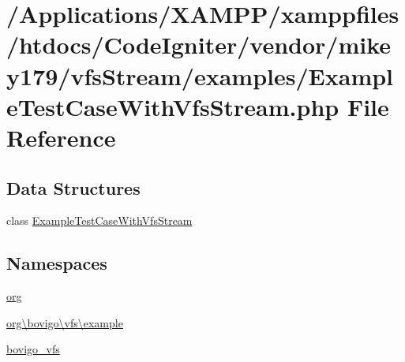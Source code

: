 \hypertarget{_example_test_case_with_vfs_stream_8php}{}\section{/\+Applications/\+X\+A\+M\+P\+P/xamppfiles/htdocs/\+Code\+Igniter/vendor/mikey179/vfs\+Stream/examples/\+Example\+Test\+Case\+With\+Vfs\+Stream.php File Reference}
\label{_example_test_case_with_vfs_stream_8php}
\subsection*{Data Structures}
\begin{DoxyCompactItemize}
\item 
class \mbox{\hyperlink{classorg_1_1bovigo_1_1vfs_1_1example_1_1_example_test_case_with_vfs_stream}{Example\+Test\+Case\+With\+Vfs\+Stream}}
\end{DoxyCompactItemize}
\subsection*{Namespaces}
\begin{DoxyCompactItemize}
\item 
 \mbox{\hyperlink{namespaceorg}{org}}
\item 
 \mbox{\hyperlink{namespaceorg_1_1bovigo_1_1vfs_1_1example}{org\textbackslash{}bovigo\textbackslash{}vfs\textbackslash{}example}}
\item 
 \mbox{\hyperlink{namespacebovigo__vfs}{bovigo\+\_\+vfs}}
\end{DoxyCompactItemize}
